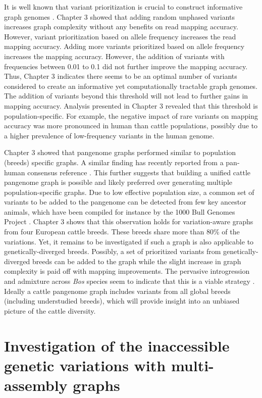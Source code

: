 \documentclass[../main.tex]{subfiles}
\begin{document}
It is well known that variant prioritization is crucial to construct informative graph genomes \citep{pritt2018forge,jain2021variant}. Chapter 3 showed that adding random unphased variants increases graph complexity without any benefits on read mapping accuracy. However, variant prioritization based on allele frequency increases the read mapping accuracy. Adding more variants prioritized based on allele frequency increases the mapping accuracy. However, the addition of variants with frequencies between 0.01 to 0.1 did not further improve the mapping accuracy. Thus, Chapter 3 indicates there seems to be an optimal number of variants considered to create an informative yet computationally tractable graph genomes. The addition of variants beyond this threshold will not lead to further gains in mapping accuracy. Analysis presented in Chapter 3 revealed that this threshold is population-specific. For example, the negative impact of rare variants on mapping accuracy was more pronounced in human than cattle populations, possibly due to a higher prevalence of low-frequency variants in the human genome. 

Chapter 3 showed that pangenome graphs performed similar  to population (breeds) specific graphs. A similar finding has recently reported from a pan-human consensus reference \citep{kaminow2020virtue}. This further suggests that building a unified cattle pangenome graph is possible and likely preferred over generating multiple population-specific graphs. Due to low effective population size, a common set of variants to be added to the pangenome can be detected from few key ancestor animals, which have been compiled for instance by the 1000 Bull Genomes Project \citep{hayes20191000}.  Chapter 3 shows that this observation holds for variation-aware graphs from four European cattle breeds. These breeds share more than 80\% of the variations. Yet, it remains to be investigated  if such a graph is also applicable to genetically-diverged breeds. Possibly, a set of prioritized variants from genetically-diverged breeds can be added to the graph while the slight increase in graph complexity is paid off with mapping improvements. The pervasive introgression and admixture across \emph{Bos} species seem to indicate that this is a viable strategy \citep{wu2018pervasive}. Ideally a cattle pangenome graph includes variants from all global breeds (including understudied breeds), which will provide insight into an unbiased picture of the cattle diversity. 

\section{Investigation of the inaccessible genetic variations with multi-assembly graphs}
\end{document}
